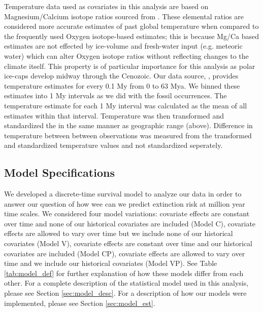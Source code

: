 \documentclass[12pt,letterpaper]{article}
\begin{document}
Temperature data used as covariates in this analysis are based on Magnesium/Calcium isotope ratios sourced from \citet{Cramer2011}. These elemental ratios are considered more accurate estimates of past global temperature when compared to the frequently used Oxygen isotope-based estimates; this is because Mg/Ca based estimates are not effected by ice-volume and fresh-water input (e.g. meteoric water) which can alter Oxygen isotope ratios without reflecting changes to the climate itself. This property is of particular importance for this analysis as polar ice-caps develop midway through the Cenozoic. Our data source, \citet{Cramer2011}, provides temperature estimates for every 0.1 My from 0 to 63 Mya. We binned these estimates into 1 My intervals as we did with the fossil occurrences. The temperature estimate for each 1 My interval was calculated as the mean of all estimates within that interval. Temperature was then transformed and standardized the in the same manner as geographic range (above). Difference in temperature between between observations was measured from the transformed and standardized temperature values and not standardized seperately.




\subsection{Model Specifications}

We developed a discrete-time survival model to analyze our data in order to answer our question of how wee can we predict extinction risk at million year time scales. We considered four model variations: covariate effects are constant over time and none of our historical covariates are included (Model C), covariate effects are allowed to vary over time but we include none of our historical covariates (Model V), covariate effects are constant over time and our historical covariates are included (Model CP), covariate effects are allowed to vary over time and we include our historical covariates (Model VP). See Table \ref{tab:model_def} for further explanation of how these models differ from each other. For a complete description of the statistical model used in this analysis, please see Section \ref{sec:model_desc}. For a description of how our models were implemented, please see Section \ref{sec:model_est}.
\end{document}
